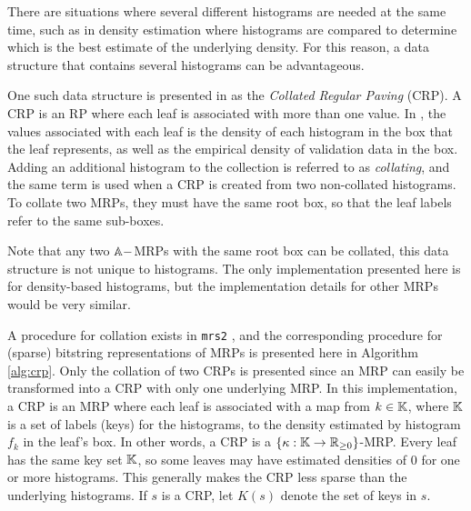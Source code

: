 \documentclass[../mapped-regular-pavings.tex]{subfiles}
\begin{document}
  There are situations where
  several different histograms are needed at the same time,
  such as in density estimation where histograms are 
  compared to determine which is the best estimate of
  the underlying density.
  For this reason, a data structure that contains several histograms can be advantageous.

  One such data structure is presented in 
  \cite{srp-mde-raaz-teng} as the \textit{Collated Regular Paving} (CRP).
  A CRP is an RP where each leaf is associated with more than one value.
  In \cite{srp-mde-raaz-teng}, the values associated with each leaf is
  the density of each histogram in the box that the leaf represents,
  as well as the empirical density of validation data in the box.
  Adding an additional histogram to the collection is referred to as \textit{collating},
  and the same term is used when a CRP is created from two non-collated histograms.
  To collate two MRPs, they must have the same root box,
  so that the leaf labels refer to the same sub-boxes.

  Note that any two $\mathbb{A}-$MRPs with the same root box can be collated,
  this data structure is not unique to histograms.
  The only implementation presented here is for density-based histograms,
  but the implementation details for other MRPs would be very similar.

  A procedure for collation exists in \verb|mrs2| \cite{mrs2},
  and the corresponding procedure for (sparse) bitstring representations
  of MRPs is presented here in Algorithm \ref{alg:crp}.
  Only the collation of two CRPs is presented since
  an MRP can easily be transformed into a CRP with only one underlying MRP.
  In this implementation, a CRP is an MRP where each leaf is associated
  with a map from $k \in \mathbb{K}$, where $\mathbb{K}$ is a set of labels (keys) for the histograms,
  to the density estimated by histogram $f_k$ in the leaf's box.
  In other words, a CRP is a $\{ \kappa : \mathbb{K} \to \mathbb{R}_{\ge 0} \}$-MRP.
  Every leaf has the same key set $\mathbb{K}$, so some leaves may 
  have estimated densities of 0 for one or more histograms.
  This generally makes the CRP less sparse than the underlying histograms.
  If $s$ is a CRP, let $K(s)$ denote the set of keys in $s$.
\end{document}
